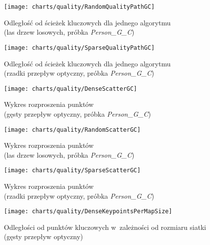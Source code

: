     \begin{figure}[!ht]
      \centering
      \texttt{[image: charts/quality/RandomQualityPathGC]}
      \caption[Odległość od ścieżek kluczowych dla jednego algorytmu]
              {Odległość od ścieżek kluczowych dla jednego algorytmu\\(las drzew losowych, próbka \textit{Person\_G\_C})}
      \label{fig:RandomQualityPathGC}
    \end{figure}

    \begin{figure}[!ht]
      \centering
      \texttt{[image: charts/quality/SparseQualityPathGC]}
      \caption[Odległość od ścieżek kluczowych dla jednego algorytmu]
              {Odległość od ścieżek kluczowych dla jednego algorytmu\\(rzadki przepływ optyczny, próbka \textit{Person\_G\_C})}
      \label{fig:SparseQualityPathGC}
    \end{figure}

    \newpage
    \begin{figure}[!ht]
      \centering
      \texttt{[image: charts/quality/DenseScatterGC]}
      \caption[Wykres rozproszenia punktów]
              {Wykres rozproszenia punktów\\(gęsty przepływ optyczny, próbka \textit{Person\_G\_C})}
      \label{fig:DenseScatterGC}
    \end{figure}

    \begin{figure}[!ht]
      \centering
      \texttt{[image: charts/quality/RandomScatterGC]}
      \caption[Wykres rozproszenia punktów]
              {Wykres rozproszenia punktów\\(las drzew losowych, próbka \textit{Person\_G\_C})}
      \label{fig:RandomScatterGC}
    \end{figure}

    \begin{figure}[!ht]
      \centering
      \texttt{[image: charts/quality/SparseScatterGC]}
      \caption[Wykres rozproszenia punktów]
              {Wykres rozproszenia punktów\\(rzadki przepływ optyczny, próbka \textit{Person\_G\_C})}
      \label{fig:SparseScatterGC}
    \end{figure}

    \newpage
    \begin{figure}[!ht]
      \centering
      \texttt{[image: charts/quality/DenseKeypointsPerMapSize]}
      \caption[Odległości od punktów kluczowych w~zależności od rozmiaru siatki]
              {Odległości od punktów kluczowych w~zależności od rozmiaru siatki (gęsty przepływ optyczny)}
      \label{fig:DenseKeypointsPerMapSize}
    \end{figure}

